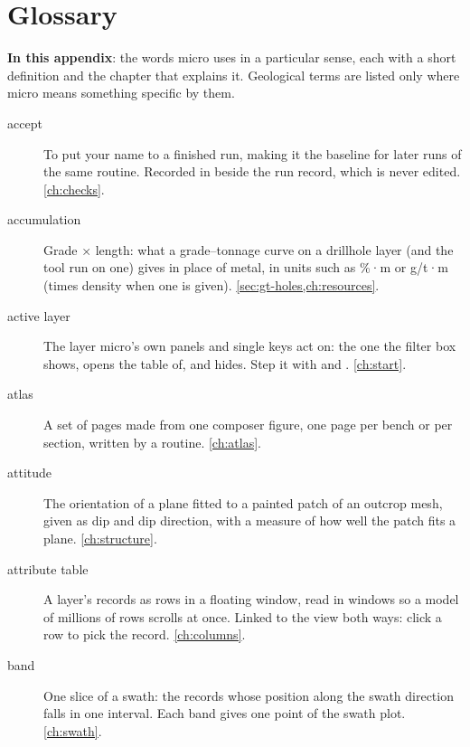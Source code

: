 \chapter{Glossary}\label{app:glossary}\label{ch:glossary}

\begin{goals}
\textbf{In this appendix}: the words micro uses in a particular sense, each with a short definition
and the chapter that explains it. Geological terms are listed only where micro means something
specific by them.
\end{goals}

\begin{description}

\item[accept] To put your name to a finished run, making it the baseline for later runs of the same
  routine. Recorded in  beside the run record, which is never edited.
  \cref{ch:checks}.

\item[accumulation] Grade × length: what a grade–tonnage curve on a drillhole layer (and the
   tool run on one) gives in place of metal, in units such as \%·m or g/t·m (times density when one is given).
  \cref{sec:gt-holes,ch:resources}.

\item[active layer] The layer micro's own panels and single keys act on: the one the filter box
  shows,  opens the table of, and  hides. Step it with \key{[} and \key{]}.
  \cref{ch:start}.

\item[atlas] A set of pages made from one composer figure, one page per bench or per section,
  written by a routine. \cref{ch:atlas}.

\item[attitude] The orientation of a plane fitted to a painted patch of an outcrop mesh, given as
  dip and dip direction, with a measure of how well the patch fits a plane. \cref{ch:structure}.

\item[attribute table] A layer's records as rows in a floating window, read in windows so a model
  of millions of rows scrolls at once. Linked to the view both ways: click a row to pick the
  record. \cref{ch:columns}.

\item[band] One slice of a swath: the records whose position along the swath direction falls in one
  interval. Each band gives one point of the swath plot. \cref{ch:swath}.


\end{description}
